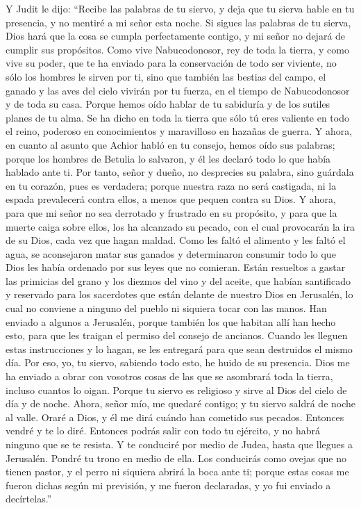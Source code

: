  Y Judit le dijo: ``Recibe las palabras de tu siervo, y
deja que tu sierva hable en tu presencia, y no mentiré a mi señor esta
noche.  Si sigues las palabras de tu sierva, Dios hará que
la cosa se cumpla perfectamente contigo, y mi señor no dejará de cumplir
sus propósitos.  Como vive Nabucodonosor, rey de toda la
tierra, y como vive su poder, que te ha enviado para la conservación de
todo ser viviente, no sólo los hombres le sirven por ti, sino que
también las bestias del campo, el ganado y las aves del cielo vivirán
por tu fuerza, en el tiempo de Nabucodonosor y de toda su casa.
 Porque hemos oído hablar de tu sabiduría y de los sutiles
planes de tu alma. Se ha dicho en toda la tierra que sólo tú eres
valiente en todo el reino, poderoso en conocimientos y maravilloso en
hazañas de guerra.  Y ahora, en cuanto al asunto que
Achior habló en tu consejo, hemos oído sus palabras; porque los hombres
de Betulia lo salvaron, y él les declaró todo lo que había hablado ante
ti.  Por tanto, señor y dueño, no desprecies su palabra,
sino guárdala en tu corazón, pues es verdadera; porque nuestra raza no
será castigada, ni la espada prevalecerá contra ellos, a menos que
pequen contra su Dios.  Y ahora, para que mi señor no sea
derrotado y frustrado en su propósito, y para que la muerte caiga sobre
ellos, los ha alcanzado su pecado, con el cual provocarán la ira de su
Dios, cada vez que hagan maldad.  Como les faltó el
alimento y les faltó el agua, se aconsejaron matar sus ganados y
determinaron consumir todo lo que Dios les había ordenado por sus leyes
que no comieran.  Están resueltos a gastar las primicias
del grano y los diezmos del vino y del aceite, que habían santificado y
reservado para los sacerdotes que están delante de nuestro Dios en
Jerusalén, lo cual no conviene a ninguno del pueblo ni siquiera tocar
con las manos.  Han enviado a algunos a Jerusalén, porque
también los que habitan allí han hecho esto, para que les traigan el
permiso del consejo de ancianos.  Cuando les lleguen
estas instrucciones y lo hagan, se les entregará para que sean
destruidos el mismo día.  Por eso, yo, tu siervo,
sabiendo todo esto, he huido de su presencia. Dios me ha enviado a obrar
con vosotros cosas de las que se asombrará toda la tierra, incluso
cuantos lo oigan.  Porque tu siervo es religioso y sirve
al Dios del cielo de día y de noche. Ahora, señor mío, me quedaré
contigo; y tu siervo saldrá de noche al valle. Oraré a Dios, y él me
dirá cuándo han cometido sus pecados.  Entonces vendré y
te lo diré. Entonces podrás salir con todo tu ejército, y no habrá
ninguno que se te resista.  Y te conduciré por medio de
Judea, hasta que llegues a Jerusalén. Pondré tu trono en medio de ella.
Los conducirás como ovejas que no tienen pastor, y el perro ni siquiera
abrirá la boca ante ti; porque estas cosas me fueron dichas según mi
previsión, y me fueron declaradas, y yo fui enviado a decírtelas.''

